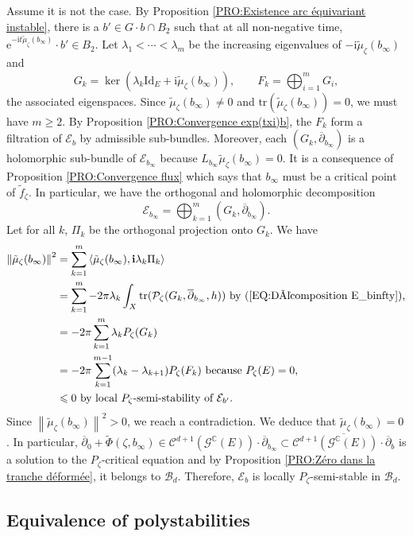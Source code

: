 \documentclass{article}
\theoremstyle{remark}
\theoremstyle{definition}
\newcommand{\C}{\mathbb{C}}
\newcommand{\tr}{\mathrm{tr}}
\newcommand{\Id}{\mathrm{Id}}
\renewcommand{\i}{\boldsymbol{\mathrm{i}}}
\newcommand{\e}{\boldsymbol{\mathrm{e}}}
\newcommand{\scal}[2]{\left< #1,#2 \right>}
\newcommand{\norme}[1]{\left\| #1 \right\|}
\newcommand{\E}{\mathcal{E}}
\newcommand{\G}{\mathcal{G}}
\newcommand{\mB}{\mathcal{B}}
\newcommand{\mC}{\mathcal{C}}
\newcommand{\mP}{\mathcal{P}}
\newcommand{\dbar}{\overline{\partial}}
\renewcommand{\leq}{\leqslant}
\renewcommand{\geq}{\geqslant}
\begin{document}
Assume it is not the case. By Proposition \ref{PRO:Existence arc équivariant instable}, there is a $b' \in G \cdot b \cap B_2$ such that at all non-negative time, $\e^{-\i t\tilde{\mu}_\zeta(b_\infty)} \cdot b' \in B_2$. Let $\lambda_1 < \cdots < \lambda_m$ be the increasing eigenvalues of $-\i\tilde{\mu}_\zeta(b_\infty)$ and
$$
G_k = \ker(\lambda_k\Id_E + \i\tilde{\mu}_\zeta(b_\infty)), \qquad F_k = \bigoplus_{i = 1}^m G_i,
$$
the associated eigenspaces. Since $\tilde{\mu}_\zeta(b_\infty) \neq 0$ and $\tr(\tilde{\mu}_\zeta(b_\infty)) = 0$, we must have $m \geq 2$. By Proposition \ref{PRO:Convergence exp(txi)b}, the $F_k$ form a filtration of $\E_b$ by admissible sub-bundles. Moreover, each $(G_k,\dbar_{b_\infty})$ is a holomorphic sub-bundle of $\E_{b_\infty}$ because $L_{b_\infty}\tilde{\mu}_\zeta(b_\infty) = 0$. It is a consequence of Proposition \ref{PRO:Convergence flux} which says that $b_\infty$ must be a critical point of $\tilde{f}_\zeta$. In particular, we have the orthogonal and holomorphic decomposition
\begin{equation}\label{EQ:Décomposition E_binfty}
    \E_{b_\infty} = \bigoplus_{k = 1}^m (G_k,\dbar_{b_\infty}).
\end{equation}
Let for all $k$, $\Pi_k$ be the orthogonal projection onto $G_k$. We have
\begin{align*}
    \norme{\tilde{\mu}_\zeta(b_\infty)}^2 & = \sum_{k = 1}^m \scal{\tilde{\mu}_\zeta(b_\infty)}{\i\lambda_k\Pi_k}\\
    & = \sum_{k = 1}^m -2\pi\lambda_k\int_X \tr(\mP_\zeta(G_k,\dbar_{b_\infty},h)) \textrm{ by (\ref{EQ:Décomposition E_binfty}),}\\
    & = -2\pi\sum_{k = 1}^m \lambda_kP_\zeta(G_k)\\
    & = -2\pi\sum_{k = 1}^{m - 1} (\lambda_k - \lambda_{k + 1})P_\zeta(F_k) \textrm{ because } P_\zeta(E) = 0,\\
    & \leq 0 \textrm{ by local $P_\zeta$-semi-stability of $\E_{b'}$.}
\end{align*}
Since $\norme{\tilde{\mu}_\zeta(b_\infty)}^2 > 0$, we reach a contradiction. We deduce that $\tilde{\mu}_\zeta(b_\infty) = 0$. In particular, $\dbar_0 + \tilde{\Phi}(\zeta,b_\infty) \in \mC^{d + 1}(\G^\C(E)) \cdot \dbar_{b_\infty} \subset \overline{\mC^{d + 1}(\G^\C(E)) \cdot \dbar_b}$ is a solution to the $P_\zeta$-critical equation and by Proposition \ref{PRO:Zéro dans la tranche déformée}, it belongs to $\mB_d$. Therefore, $\E_b$ is locally $P_\zeta$-semi-stable in $\mB_d$.

\subsection{Equivalence of polystabilities}\label{SEC:Equivalence polystabilités}
\end{document}
